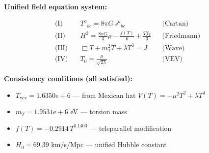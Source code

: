 
\textbf{Unified field equation system:}

\begin{align}
  \text{(I)} \quad & T^a{}_{bc} = 8\pi G \, s^a{}_{bc} && \text{(Cartan)} \\
  \text{(II)} \quad & H^2 = \frac{8\pi G}{3}\rho - \frac{f(T)}{6} + \frac{Tf_T}{3} && \text{(Friedmann)} \\
  \text{(III)} \quad & \Box T + m_T^2 T + \lambda T^3 = J && \text{(Wave)} \\
  \text{(IV)} \quad & T_0 = \frac{\mu}{\sqrt{2\lambda}} && \text{(VEV)}
\end{align}

\textbf{Consistency conditions (all satisfied):}
\begin{itemize}
  \item $T_{\text{vev}} = 1.6350e+6$ — from Mexican hat $V(T) = -\mu^2 T^2 + \lambda T^4$
  \item $m_T = 1.9531e+6$ eV — torsion mass
  \item $f(T) = -0.2914 \, T^{0.1403}$ — teleparallel modification
  \item $H_0 = 69.39$ km/s/Mpc — unified Hubble constant
\end{itemize}